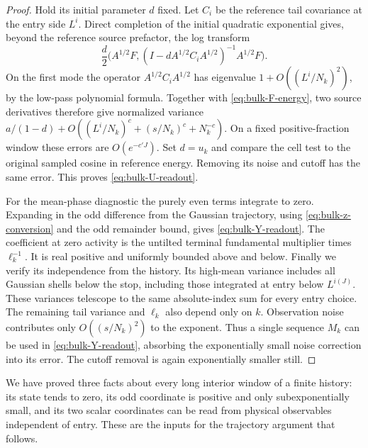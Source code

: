 \begin{proof}
Hold its initial parameter $d$ fixed.  Let $C_i$ be the reference
tail covariance at the entry side $L^i$.  Direct completion of
the initial quadratic exponential gives, beyond the reference
source prefactor, the log transform
\begin{equation}\label{eq:bulk-Gaussian-readout}
 \frac d2
 \bigl(A^{1/2}F,
 (I-dA^{1/2}C_iA^{1/2})^{-1}A^{1/2}F\bigr).
\end{equation}
On the first mode the operator $A^{1/2}C_iA^{1/2}$ has eigenvalue
$1+O((L^i/N_k)^2)$, by the low-pass polynomial formula.
Together with \eqref{eq:bulk-F-energy}, two source derivatives
therefore give normalized variance
$a/(1-d)+O((L^i/N_k)^c+(s/N_k)^c+N_k^{-c})$.
On a fixed positive-fraction window these errors are
$O(e^{-c'J})$.  Set $d=u_k$ and compare the cell test to the
original sampled cosine in reference energy.  Removing its
noise and cutoff has the same error.  This proves
\eqref{eq:bulk-U-readout}.

For the mean-phase diagnostic the purely even terms integrate
to zero.  Expanding in the odd difference from the Gaussian
trajectory, using \eqref{eq:bulk-z-conversion} and the odd
remainder bound, gives \eqref{eq:bulk-Y-readout}.  The
coefficient at zero activity is the untilted terminal
fundamental multiplier times $\ell_k^{-1}$.  It is real positive
and uniformly bounded above and below.  Finally we verify its
independence from the history.  Its high-mean variance includes
all Gaussian shells below the stop, including those integrated
at entry below $L^{i(J)}$.  These variances telescope to the
same absolute-index sum for every entry choice.  The remaining
tail variance and $\ell_k$ also depend only on $k$.
Observation noise contributes only $O((s/N_k)^2)$ to the
exponent.  Thus a single sequence $M_k$ can be used in
\eqref{eq:bulk-Y-readout}, absorbing the exponentially small
noise correction into its error.  The cutoff removal is again
exponentially smaller still.
\end{proof}

We have proved three facts about every long interior window of a
finite history: its state tends to zero, its odd coordinate is
positive and only subexponentially small, and its two scalar
coordinates can be read from physical observables independent of
entry.  These are the inputs for the trajectory argument that
follows.
